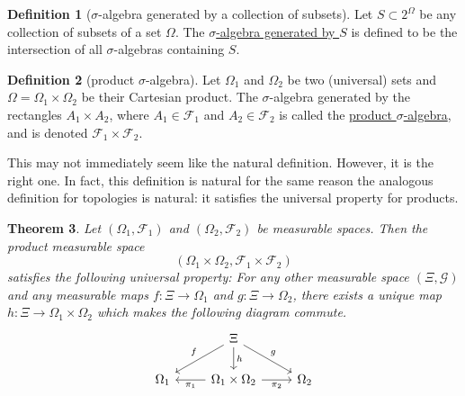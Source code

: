 \documentclass[a4paper,12pt]{scrreprt}
\newcommand{\defn}[1]{\ul{#1}}
\theoremstyle{definition}
\newtheorem{definition}{Definition}
\theoremstyle{plain}
\newtheorem{theorem}[definition]{Theorem}
\theoremstyle{remark}
\begin{document}
\begin{definition}[$\sigma$-algebra generated by a collection of subsets]
  \label{def:generatedsigmaalgebra}
  Let $S \subset 2^{\Omega}$ be any collection of subsets of a set $\Omega$. The \defn{$\sigma$-algebra generated by $S$} is defined to be the intersection of all $\sigma$-algebras containing $S$.
\end{definition}

\begin{definition}[product $\sigma$-algebra]
  \label{def:productsigmaalgebra}
  Let $\Omega_{1}$ and $\Omega_{2}$ be two (universal) sets and $\Omega = \Omega_{1} \times \Omega_{2}$ be their Cartesian product. The $\sigma$-algebra generated by the rectangles $A_{1} \times A_{2}$, where $A_{1} \in \mathcal{F}_{1}$ and $A_{2} \in \mathcal{F}_{2}$ is called the \defn{product $\sigma$-algebra}, and is denoted $\mathcal{F}_{1} \times \mathcal{F}_{2}$.
\end{definition}

This may not immediately seem like the natural definition. However, it is the right one. In fact, this definition is natural for the same reason the analogous definition for topologies is natural: it satisfies the universal property for products.

\begin{theorem}
  \label{thm:universalpropertyforproductofmeasurablespaces}
  Let $(\Omega_{1}, \mathcal{F}_{1})$ and $(\Omega_{2}, \mathcal{F}_{2})$ be measurable spaces. Then the product measurable space
  \begin{equation*}
    (\Omega_{1} \times \Omega_{2}, \mathcal{F}_{1} \times \mathcal{F}_{2})
  \end{equation*}
  satisfies the following universal property: For any other measurable space $(\Xi, \mathcal{G})$ and any measurable maps $f\colon \Xi \to \Omega_{1}$ and $g\colon \Xi \to \Omega_{2}$, there exists a unique map $h\colon \Xi \to \Omega_{1} \times \Omega_{2}$ which makes the following diagram commute.
  \begin{equation*}
    \begin{tikzcd}
      & \Xi
      \arrow[dr, "g"]
      \arrow[dl, swap, "f"]
      \arrow[d, "h"]
      \\
      \Omega_{1}
      & \Omega_{1} \times \Omega_{2}
      \arrow[l, "\pi_{1}"]
      \arrow[r, swap, "\pi_{2}"]
      & \Omega_{2}
    \end{tikzcd}
  \end{equation*}
\end{theorem}
\end{document}
